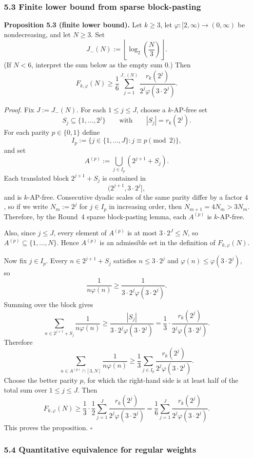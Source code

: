 \subsubsection{5.3 Finite lower bound from sparse block-pasting}

\noindent\textbf{Proposition 5.3 (finite lower bound).}
Let $k\ge 3$, let $\varphi:[2,\infty)\to(0,\infty)$ be nondecreasing, and let $N\ge 3$. Set
\[
J_-(N):=\left\lfloor \log_2\left(\frac{N}{3}\right)\right\rfloor.
\]
(If $N<6$, interpret the sum below as the empty sum $0$.) Then
\[
F_{k,\varphi}(N)
\ge
\frac16\sum_{j=1}^{J_-(N)} \frac{r_k(2^j)}{2^j\varphi(3\cdot 2^j)}.
\]

\noindent\emph{Proof.}
Fix $J:=J_-(N)$. For each $1\le j\le J$, choose a $k$-AP-free set
\[
S_j\subseteq\{1,\dots,2^j\}
\qquad\text{with}\qquad |S_j|=r_k(2^j).
\]
For each parity $p\in\{0,1\}$ define
\[
I_p:=\{j\in\{1,\dots,J\}: j\equiv p\pmod 2\},
\]
and set
\[
A^{(p)}:=\bigcup_{j\in I_p} (2^{j+1}+S_j).
\]
Each translated block $2^{j+1}+S_j$ is contained in
\[
(2^{j+1},3\cdot 2^j],
\]
and is $k$-AP-free. Consecutive dyadic scales of the same parity differ by a factor $4$, so if we write $N_m:=2^j$ for $j\in I_p$ in increasing order, then $N_{m+1}=4N_m>3N_m$. Therefore, by the Round~4 sparse block-pasting lemma, each $A^{(p)}$ is $k$-AP-free.

Also, since $j\le J$, every element of $A^{(p)}$ is at most $3\cdot 2^J\le N$, so $A^{(p)}\subseteq\{1,\dots,N\}$. Hence $A^{(p)}$ is an admissible set in the definition of $F_{k,\varphi}(N)$.

Now fix $j\in I_p$. Every $n\in 2^{j+1}+S_j$ satisfies $n\le 3\cdot 2^j$ and $\varphi(n)\le \varphi(3\cdot 2^j)$, so
\[
\frac{1}{n\varphi(n)}\ge \frac{1}{3\cdot 2^j\varphi(3\cdot 2^j)}.
\]
Summing over the block gives
\[
\sum_{n\in 2^{j+1}+S_j}\frac{1}{n\varphi(n)}
\ge
\frac{|S_j|}{3\cdot 2^j\varphi(3\cdot 2^j)}
=
\frac{1}{3}\cdot \frac{r_k(2^j)}{2^j\varphi(3\cdot 2^j)}.
\]
Therefore
\[
\sum_{n\in A^{(p)}\cap[3,N]}\frac{1}{n\varphi(n)}
\ge
\frac13\sum_{j\in I_p}\frac{r_k(2^j)}{2^j\varphi(3\cdot 2^j)}.
\]
Choose the better parity $p$, for which the right-hand side is at least half of the total sum over $1\le j\le J$. Then
\[
F_{k,\varphi}(N)
\ge
\frac13\cdot \frac12
\sum_{j=1}^{J}\frac{r_k(2^j)}{2^j\varphi(3\cdot 2^j)}
=
\frac16\sum_{j=1}^{J}\frac{r_k(2^j)}{2^j\varphi(3\cdot 2^j)}.
\]
This proves the proposition.
\hfill$\square$

\subsubsection{5.4 Quantitative equivalence for regular weights}

